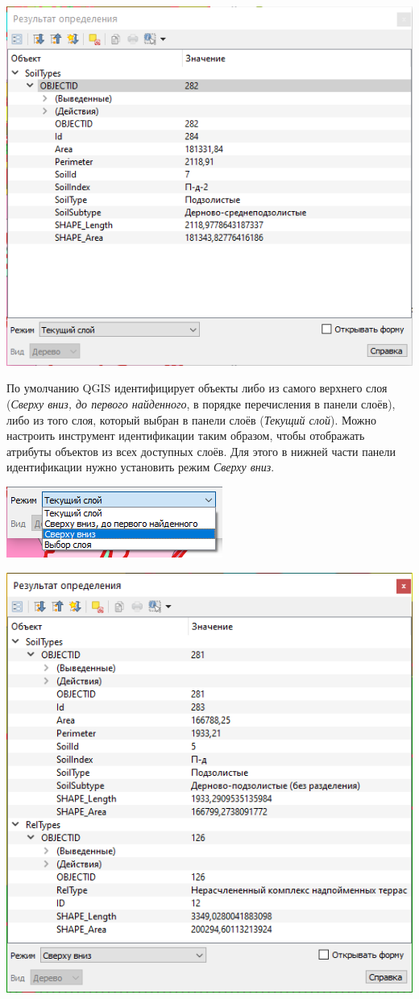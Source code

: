 \documentclass[
  12pt,
]{book}
\begin{document}
\begin{enumerate}
  \includegraphics{images/Ex06/identify1.png}

  По умолчанию QGIS идентифицирует объекты либо из самого верхнего слоя (\emph{Сверху вниз, до первого найденного}, в порядке перечисления в панели слоёв), либо из того слоя, который выбран в панели слоёв (\emph{Текущий слой}). Можно настроить инструмент идентификации таким образом, чтобы отображать атрибуты объектов из всех доступных слоёв. Для этого в нижней части панели идентификации нужно установить режим \emph{Сверху вниз}.

  \includegraphics{images/Ex06/identify2.png}

  \includegraphics{images/Ex06/identify3.png}


\end{enumerate}
\end{document}
